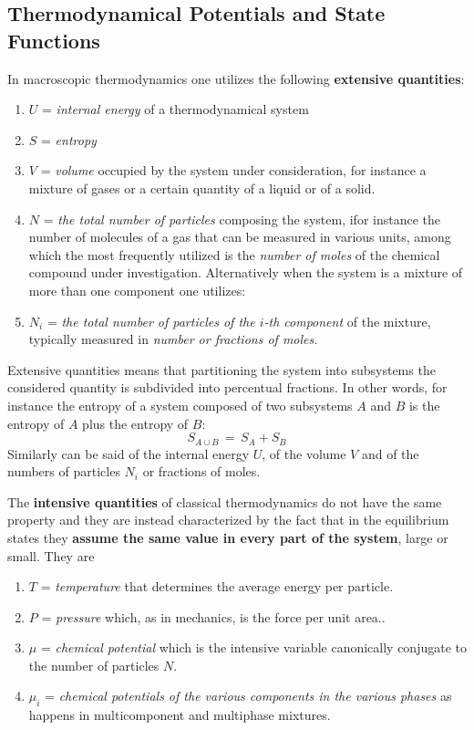 \documentclass[10pt,a4paper]{article}
\begin{document}
\subsection{Thermodynamical Potentials and State Functions}
\label{pottherm} In macroscopic thermodynamics one utilizes the  following
\textbf{extensive quantities}:
\begin{enumerate}
  \item $U$ = \textit{internal energy} of a thermodynamical system
  \item $S$ = \textit{entropy}
  \item $V$ = \textit{volume} occupied by the system under consideration, for instance a mixture of gases or a certain quantity of a liquid or of a solid.
  \item $N$ = \textit{the total number of particles} composing the system,
   ifor instance the number of molecules of a gas that can be measured in various units,
among which the most frequently utilized  is the \textit{number of moles} of the chemical compound under
investigation. Alternatively when the system is a mixture of more than one component
one utilizes:
\item  $N_i$ = \textit{the total number of particles of the
$i$-th component} of the mixture, typically measured in \textit{number or fractions
of moles.}
\end{enumerate}
Extensive quantities means that partitioning the  system into subsystems
the considered quantity is subdivided into percentual fractions. In other words, for instance the entropy of a system
composed  of two subsystems $A$ and $B$ is the entropy of
$A$ plus the  entropy of $B$:
\begin{equation}\label{ciucca}
    S_{A \cup B} \, = \, S_A + S_B
\end{equation}
Similarly can be said of the internal energy $U$, of the volume $V$
and of the numbers of particles $N_i$ or fractions of moles.
\par
The  \textbf{intensive quantities} of classical thermodynamics do not have the same property
and they are instead characterized by the fact that in the equilibrium states
they \textbf{assume the same value in every part of the system}, large or small. They are
\begin{enumerate}
  \item $T$ = \textit{ temperature} that determines the average energy per particle.
  \item $P$ = \textit{pressure} which, as in mechanics, is the force per unit area..
  \item $\mu$ = \textit{chemical potential} which is the intensive variable canonically conjugate to the number of particles $N$.
  \item $\mu_i$ = \textit{chemical potentials of the various components in the various phases}
 as happens in multicomponent and multiphase mixtures.
\end{enumerate}
\end{document}
